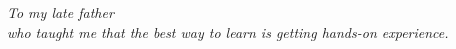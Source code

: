\phantom{a}
\vfill
\begin{center}
\textit{To my late father}\\
\textit{who taught me that the best way to learn is getting hands-on experience.}
\end{center}
\vfill
